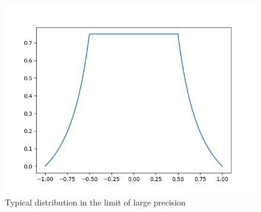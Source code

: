 \documentclass[10pt,a4paper]{article}
\theoremstyle{plain}
\theoremstyle{definition}
\begin{document}
\begin{figure}[h!]
\begin{center}
\includegraphics[scale=0.75]{Code/pics/typical_dist}
\end{center}
\caption{Typical distribution in the limit of large precision}
\label{fig:typical}
\end{figure}
\end{document}
